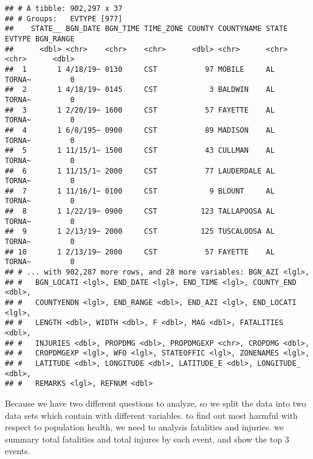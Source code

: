 \documentclass[
]{article}
\newenvironment{Shaded}{\begin{snugshade}}{\end{snugshade}}
\newcommand{\CommentTok}[1]{\textcolor[rgb]{0.56,0.35,0.01}{\textit{#1}}}
\newcommand{\DataTypeTok}[1]{\textcolor[rgb]{0.13,0.29,0.53}{#1}}
\newcommand{\DecValTok}[1]{\textcolor[rgb]{0.00,0.00,0.81}{#1}}
\newcommand{\KeywordTok}[1]{\textcolor[rgb]{0.13,0.29,0.53}{\textbf{#1}}}
\newcommand{\NormalTok}[1]{#1}
\newcommand{\OperatorTok}[1]{\textcolor[rgb]{0.81,0.36,0.00}{\textbf{#1}}}
\newcommand{\StringTok}[1]{\textcolor[rgb]{0.31,0.60,0.02}{#1}}
\begin{document}
\begin{verbatim}
## # A tibble: 902,297 x 37
## # Groups:   EVTYPE [977]
##    STATE__ BGN_DATE BGN_TIME TIME_ZONE COUNTY COUNTYNAME STATE EVTYPE BGN_RANGE
##      <dbl> <chr>    <chr>    <chr>      <dbl> <chr>      <chr> <chr>      <dbl>
##  1       1 4/18/19~ 0130     CST           97 MOBILE     AL    TORNA~         0
##  2       1 4/18/19~ 0145     CST            3 BALDWIN    AL    TORNA~         0
##  3       1 2/20/19~ 1600     CST           57 FAYETTE    AL    TORNA~         0
##  4       1 6/8/195~ 0900     CST           89 MADISON    AL    TORNA~         0
##  5       1 11/15/1~ 1500     CST           43 CULLMAN    AL    TORNA~         0
##  6       1 11/15/1~ 2000     CST           77 LAUDERDALE AL    TORNA~         0
##  7       1 11/16/1~ 0100     CST            9 BLOUNT     AL    TORNA~         0
##  8       1 1/22/19~ 0900     CST          123 TALLAPOOSA AL    TORNA~         0
##  9       1 2/13/19~ 2000     CST          125 TUSCALOOSA AL    TORNA~         0
## 10       1 2/13/19~ 2000     CST           57 FAYETTE    AL    TORNA~         0
## # ... with 902,287 more rows, and 28 more variables: BGN_AZI <lgl>,
## #   BGN_LOCATI <lgl>, END_DATE <lgl>, END_TIME <lgl>, COUNTY_END <dbl>,
## #   COUNTYENDN <lgl>, END_RANGE <dbl>, END_AZI <lgl>, END_LOCATI <lgl>,
## #   LENGTH <dbl>, WIDTH <dbl>, F <dbl>, MAG <dbl>, FATALITIES <dbl>,
## #   INJURIES <dbl>, PROPDMG <dbl>, PROPDMGEXP <chr>, CROPDMG <dbl>,
## #   CROPDMGEXP <lgl>, WFO <lgl>, STATEOFFIC <lgl>, ZONENAMES <lgl>,
## #   LATITUDE <dbl>, LONGITUDE <dbl>, LATITUDE_E <dbl>, LONGITUDE_ <dbl>,
## #   REMARKS <lgl>, REFNUM <dbl>
\end{verbatim}

Because we have two different questions to analyze, so we split the data
into two data sets which contain with different variables. to find out
most harmful with respect to population health, we need to analysis
fatalities and injuries. we summary total fatalities and total injures
by each event, and show the top 3 events.

\begin{Shaded}
\end{Shaded}
\end{document}
